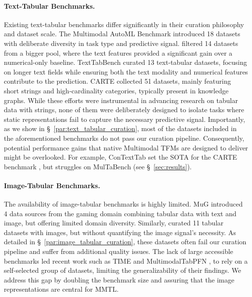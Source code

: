 \documentclass{llmxive}
\begin{document}
\paragraph{Text-Tabular Benchmarks.} Existing text-tabular benchmarks differ significantly in their curation philosophy and dataset scale. The Multimodal AutoML Benchmark \cite{shi_benchmarking_2021} introduced 18 datasets with deliberate diversity in task type and predictive signal. \citet{grinsztajn_vectorizing_2023} filtered 14 datasets from a bigger pool, where the text features provided a significant gain over a numerical-only baseline. TextTabBench \cite{mraz_towards_2025} curated 13 text-tabular datasets, focusing on longer text fields while ensuring both the text modality and numerical features contribute to the prediction. CARTE \citep{kim_carte_2024} collected 51 datasets, mainly featuring short strings and high-cardinality categories, typically present in knowledge graphs. While these efforts were instrumental in advancing research on tabular data with strings, none of them were deliberately designed to isolate tasks where static representations fail to capture the necessary predictive signal. Importantly, as we show in \S~\ref{par:text_tabular_curation}, most of the datasets included in the aforementioned benchmarks do not pass our curation pipeline. Consequently, potential performance gains that native Multimodal TFMs are designed to deliver might be overlooked. For example, ConTextTab set the SOTA for the CARTE benchmark \cite{spinaci_contexttab_2025}, but struggles on MulTaBench (see \S~\ref{sec:results}).


\paragraph{Image-Tabular Benchmarks.} The availability of image-tabular benchmarks is highly limited. MuG \citep{lu_mug_2023} introduced 4 data sources from the gaming domain combining tabular data with text and image, but offering limited domain diversity. Similarly, \citet{tang_bag_2024} curated 11 tabular datasets with images, but without quantifying the image signal's necessity. As detailed in \S~\ref{par:image_tabular_curation}, these datasets often fail our curation pipeline and suffer from additional quality issues. The lack of large accessible benchmarks led recent work such as TIME \cite{luo_time_2025} and MultimodalTabPFN \cite{kim_multimodalpfn_2025}, to rely on a self-selected group of datasets, limiting the generalizability of their findings. We address this gap by doubling the benchmark size and assuring that the image representations are central for MMTL.
\end{document}
